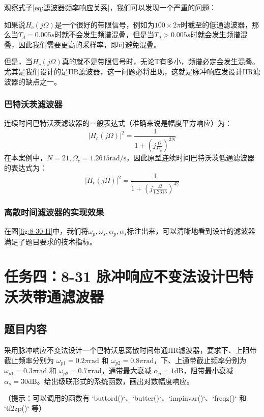 \documentclass[UTF8,12pt,a4paper]{ctexart}
\begin{document}
观察式子\eqref{eq:滤波器频率响应关系}，我们可以发现一个严重的问题：

如果说$H_c(j\Omega)$是一个很好的带限信号，例如为$100×2\pi$时截至的低通滤波器，那么当$T_d=0.005s$时就不会发生频谱混叠，但是当$T_d>0.005s$时就会发生频谱混叠，因此我们需要更高的采样率，即可避免混叠。

但是，当$H_c(j\Omega)$真的就不是带限信号时，无论T有多小，频谱必定会发生混叠。尤其是我们设计的是IIR滤波器，这一问题必将出现，这就是脉冲响应发设计IIR滤波器的缺点之一。

\subsubsection{巴特沃茨滤波器}
连续时间巴特沃茨滤波器的一般表达式（准确来说是幅度平方响应）为：
$$|H_c(j\Omega)|^2 = \frac{1}{1 + (j\frac{\Omega}{\Omega_c})^{2N}}$$
在本案例中，$N=21, \Omega_c=1.2615 \text{rad/s}$，因此原型连续时间巴特沃茨低通滤波器的表达式为：
$$|H_c(j\Omega)|^2 = \frac{1}{1 + (j\frac{\Omega}{1.2615})^{42}}$$

\subsubsection{离散时间滤波器的实现效果}
在图\ref{fig:8-30-H}中，我们将$\omega_p, \omega_s, \alpha_p, \alpha_s$标注出来，可以清晰地看到设计的滤波器满足了题目要求的技术指标。

\newpage
\section{任务四：8-31 脉冲响应不变法设计巴特沃茨带通滤波器}

\subsection{题目内容}
采用脉冲响应不变法设计一个巴特沃思离散时间带通IIR滤波器，要求下、上阻带截止频率分别为 \( \omega_{p1} = 0.2\pi \text{rad} \) 和 \( \omega_{p2} = 0.8\pi \text{rad} \)，下、上通带截止频率分别为 \( \omega_{p1} = 0.3\pi \text{rad} \) 和 \( \omega_{p2} = 0.7\pi \text{rad} \)，通带最大衰减 \( \alpha_p = 1\text{dB} \)，阻带最小衰减 \( \alpha_s = 30\text{dB} \)。给出级联形式的系统函数，画出对数幅度响应。

（提示：可以调用的函数有 `buttord()`、`butter()`、`impinvar()`、`freqz()` 和 `tf2zp()` 等）
\end{document}
